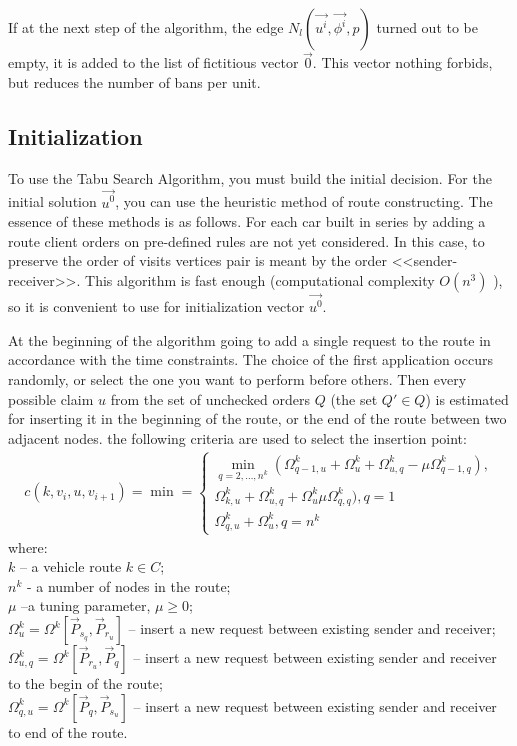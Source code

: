 \documentclass[]{TAACpaper}
\begin{document}
If at the next step of the algorithm, the edge  $N_l(\vec{u^i},\vec{\phi^i},p)$ turned out to be empty, it is added to the list of fictitious vector $\vec{0}$. This vector nothing forbids, but reduces the number of bans per unit.

\subsection{Initialization}
To use the Tabu Search Algorithm, you must build the initial decision. For the initial solution $ \vec{u^0} $, you can use the heuristic method of route constructing\cite {Cordeau2001, Braysy}. The essence of these methods is as follows. For each car built in series by adding a route client orders on pre-defined rules are not yet considered. In this case, to preserve the order of visits vertices pair is meant by the order <<sender-receiver>>. This algorithm is fast enough (computational complexity $O(n^3)$ \cite{Babb}), so it is convenient to use for initialization vector $\vec{u^0}$.

At the beginning of the algorithm going to add a single request to the route in accordance with the time constraints. The choice of the first application occurs randomly, or select the one you want to perform before others. Then every possible claim $u$ from the set of unchecked orders $ Q $ (the set $ Q'\in Q$) is estimated for inserting it in the beginning of the route, or the end of the route between two adjacent nodes. the following criteria are used to select the insertion point:
\begin{align} 
\label{insert_kr}
c(k,v_i,u,v_{i+1}) = \min =
\begin{cases}
\min_{q=2,\dots,n^k}(\Omega_{q-1,u}^k+\Omega_{u}^{k}+\Omega_{u,q}^{k}-\mu \Omega_{q-1,q}^k),\\
\Omega_{k,u}^k+\Omega_{u,q}^k+\Omega_{u}^k\mu \Omega_{q,q}^k), q=1\\
\Omega_{q,u}^k+\Omega_{u}^k, q=n^k
\end{cases}
\end{align} 
where:\\
$k$ --  a vehicle route $k\in C$;\\
$n^k$ - a number of nodes in the route;\\
$\mu$ --a tuning parameter, $\mu \ge 0 $;\\
$\Omega_{u}^k=\Omega^k[\vec{P}_{s_q}, \vec{P}_{r_u}]$ -- insert a new request between existing sender and receiver;\\
$\Omega_{u,q}^k=\Omega^k[\vec{P}_{r_u}, \vec{P}_{q}]$ -- insert a new request between existing sender and receiver to the begin of the route;\\
$\Omega_{q,u}^k=\Omega^k[\vec{P}_{q}, \vec{P}_{s_u}]$ -- insert a new request between existing sender and receiver to end of the route.
\end{document}
